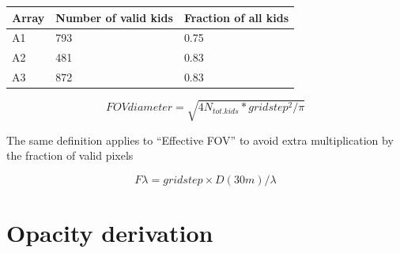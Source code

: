 \documentclass[a4paper, 11pt]{article} %
\begin{document}
\begin{table}
\begin{tabular}{|l|l|l|}
\hline
Array & Number of valid kids & Fraction of all kids\\
\hline
A1 & 793 & 0.75\\
A2 & 481 & 0.83\\
A3 & 872 & 0.83\\
\hline
\end{tabular}
\end{table}

\begin{equation}
FOV diameter = \sqrt{4 N_{tot. kids} * gridstep^2/\pi}
\end{equation}

The same definition applies to ``Effective FOV'' to avoid extra multiplication
by the fraction of valid pixels

\begin{equation}
F\lambda = gridstep\times D(30m)/\lambda
\end{equation}

\section{Opacity derivation}
\label{se:opacities}
\end{document}
